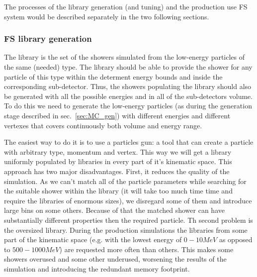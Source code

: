 The processes of the library generation (and tuning) and the production use FS system would be described separately in the two following sections.

\subsubsection{FS library generation}
\label{sec:MC_FS_gen}

The library is the set of the showers simulated from the low-energy particles of the same (needed) type. The library should be able to provide the shower for any particle of this type within the determent energy bounds and inside the corresponding sub-detector. Thus, the showers populating the library should also be generated with all the possible energies and in all of the sub-detectors volume. To do this we need to generate the low-energy particles (as during the generation stage described in sec.~\ref{sec:MC_gen}) with different energies and different vertexes that covers continuously both volume and energy range.

The easiest way to do it is to use a particles gun: a tool that can create a particle with arbitrary type, momentum and vertex. This way we will get a library uniformly populated by libraries in every part of it's kinematic space. This approach has two major disadvantages. First, it reduces the quality of the simulation. As we can't match all of the particle parameters while searching for the suitable shower within the library (it will take too much time time and require the libraries of enormous sizes), we disregard some of them and introduce large bins on some others. Because of that the matched shower can have substantially different properties then the required particle. Th second problem is the oversized library. During the production simulations the libraries from some part of the kinematic space (e.g. with the lowest energy of $0-10 MeV$ as opposed to $500-1000 MeV$) are requested more often than others. This makes some showers overused and some other underused, worsening the results of the simulation and introducing the redundant memory footprint.

